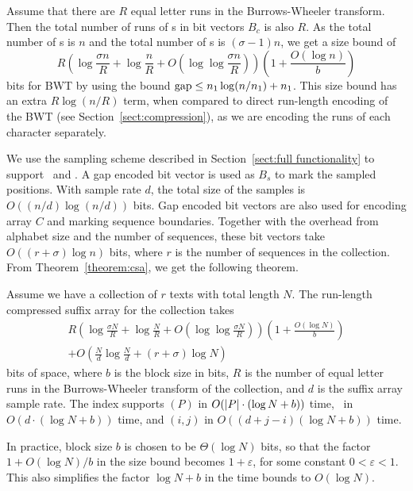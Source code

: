 Assume that there are $R$ equal letter runs in the Burrows-Wheeler transform. Then the total number of runs of \onebit{}s in bit vectors $B_{c}$ is also $R$. As the total number of \onebit{}s is $n$ and the total number of \zerobit{}s is $(\sigma - 1) n$, we get a size bound of
$$
R
\left( \log \frac{\sigma n}{R} + \log \frac{n}{R} + O\left( \log\log \frac{\sigma n}{R} \right) \right)
\left( 1 + \frac{O(\log n)}{b} \right)
$$
bits for BWT by using the bound $\operatorname{gap} \le n_{1} \log (n / n_{1}) + n_{1}$. This size bound has an extra $R \log (n/R)$ term, when compared to direct run-length encoding of the BWT (see Section~\ref{sect:compression}), as we are encoding the runs of each character separately.

We use the sampling scheme described in Section~\ref{sect:full functionality} to support \locate\ and \extract. A gap encoded bit vector is used as $B_{s}$ to mark the sampled positions. With sample rate $d$, the total size of the samples is $O((n/d) \log (n/d))$ bits. Gap encoded bit vectors are also used for encoding array $C$ and marking sequence boundaries. Together with the overhead from alphabet size and the number of sequences, these bit vectors take $O((r + \sigma) \log n)$ bits, where $r$ is the number of sequences in the collection. From Theorem~\ref{theorem:csa}, we get the following theorem.

\begin{theorem}\label{theorem:rlcsa}
Assume we have a collection of $r$ texts with total length $N$. The run-length compressed suffix array for the collection takes
\begin{multline*}
R
\left( \log \frac{\sigma N}{R} + \log \frac{N}{R} + O\left( \log\log \frac{\sigma N}{R} \right) \right)
\left( 1 + \frac{O(\log N)}{b} \right) \\
+ O\left( \frac{N}{d} \log \frac{N}{d} + (r + \sigma) \log N \right)
\end{multline*}
bits of space, where $b$ is the block size in bits, $R$ is the number of equal letter runs in the Burrows-Wheeler transform of the collection, and $d$ is the suffix array sample rate. The index supports \find$(P)$ in $O(\lvert P \rvert \cdot (\log N + b))$ time, \locate\ in $O(d \cdot (\log N + b))$ time, and \extract$(i,j)$ in $O((d + j - i) (\log N + b))$ time.
\end{theorem}

In practice, block size $b$ is chosen to be $\Theta(\log N)$ bits, so that the factor $1 + O(\log N) / b$ in the size bound becomes $1 + \varepsilon$, for some constant $0 < \varepsilon < 1$. This also simplifies the factor $\log N + b$ in the time bounds to $O(\log N)$.


